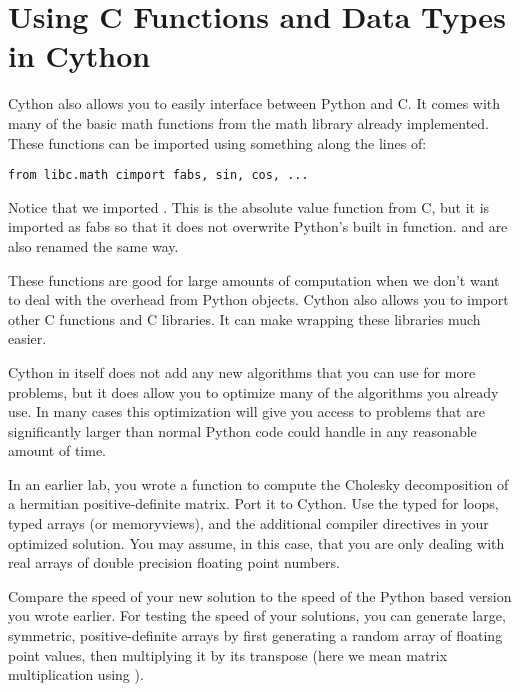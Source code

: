\section*{Using C Functions and Data Types in Cython}

Cython also allows you to easily interface between Python and C.
It comes with many of the basic math functions from the math library already implemented.
These functions can be imported using something along the lines of:
\begin{lstlisting}
from libc.math cimport fabs, sin, cos, ...
\end{lstlisting}
Notice that we imported .
This is the absolute value function from C, but it is imported as fabs so that it does not overwrite Python's built in  function. 
 and  are also renamed the same way.

These functions are good for large amounts of computation when we don't want to deal with the overhead from Python objects.
Cython also allows you to import other C functions and C libraries.
It can make wrapping these libraries much easier.

Cython in itself does not add any new algorithms that you can use for more problems, but it does allow you to optimize many of the algorithms you already use.
In many cases this optimization will give you access to problems that are significantly larger than normal Python code could handle in any reasonable amount of time.

\begin{problem}
In an earlier lab, you wrote a function to compute the Cholesky decomposition of a hermitian positive-definite matrix.
Port it to Cython.
Use the typed for loops, typed arrays (or memoryviews), and the additional compiler directives in your optimized solution.
You may assume, in this case, that you are only dealing with real arrays of double precision floating point numbers.

Compare the speed of your new solution to the speed of the Python based version you wrote earlier.
For testing the speed of your solutions, you can generate large, symmetric, positive-definite arrays by first generating a random array of floating point values, then multiplying it by its transpose (here we mean matrix multiplication using ).
\end{problem}

